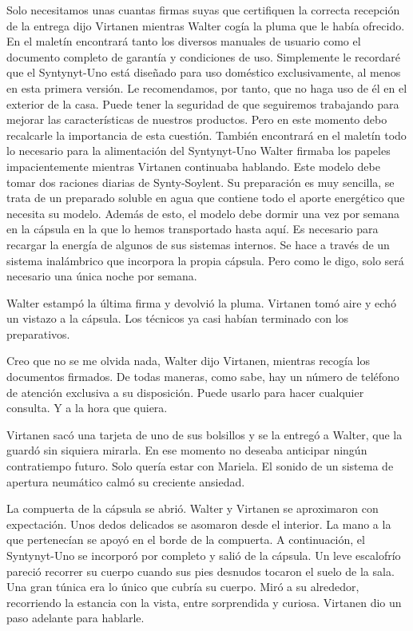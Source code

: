 	\reply Solo necesitamos unas cuantas firmas suyas que certifiquen la correcta recepción de la entrega \pause dijo Virtanen mientras Walter cogía la pluma que le había ofrecido\pauseend. En el maletín encontrará tanto los diversos manuales de usuario como el documento completo de garantía y condiciones de uso. Simplemente le recordaré que el Syntynyt-Uno está diseñado para uso doméstico exclusivamente, al menos en esta primera versión. Le recomendamos, por tanto, que no haga uso de él en el exterior de la casa. Puede tener la seguridad de que seguiremos trabajando para mejorar las características de nuestros productos. Pero en este momento debo recalcarle la importancia de esta cuestión. También encontrará en el maletín todo lo necesario para la alimentación del Syntynyt-Uno \pause Walter firmaba los papeles impacientemente mientras Virtanen continuaba hablando\pauseend. Este modelo debe tomar dos raciones diarias de Synty-Soylent. Su preparación es muy sencilla, se trata de un preparado soluble en agua que contiene todo el aporte energético que necesita su modelo. Además de esto, el modelo debe dormir una vez por semana en la cápsula en la que lo hemos transportado hasta aquí. Es necesario para recargar la energía de algunos de sus sistemas internos. Se hace a través de un sistema inalámbrico que incorpora la propia cápsula. Pero como le digo, solo será necesario una única noche por semana.
	
Walter estampó la última firma y devolvió la pluma. Virtanen tomó aire y echó un vistazo a la cápsula. Los técnicos ya casi habían terminado con los preparativos.
	
	\reply Creo que no se me olvida nada, Walter \pause dijo Virtanen, mientras recogía los documentos firmados\pauseend. De todas maneras, como sabe, hay un número de teléfono de atención exclusiva a su disposición. Puede usarlo para hacer cualquier consulta. Y a la hora que quiera.
	
Virtanen sacó una tarjeta de uno de sus bolsillos y se la entregó a Walter, que la guardó sin siquiera mirarla. En ese momento no deseaba anticipar ningún contratiempo futuro. Solo quería estar con Mariela. El sonido de un sistema de apertura neumático calmó su creciente ansiedad.

La compuerta de la cápsula se abrió. Walter y Virtanen se aproximaron con expectación. Unos dedos delicados se asomaron desde el interior. La mano a la que pertenecían se apoyó en el borde de la compuerta. A continuación, el Syntynyt-Uno se incorporó por completo y salió de la cápsula. Un leve escalofrío pareció recorrer su cuerpo cuando sus pies desnudos tocaron el suelo de la sala. Una gran túnica era lo único que cubría su cuerpo. Miró a su alrededor, recorriendo la estancia con la vista, entre sorprendida y curiosa. Virtanen dio un paso adelante para hablarle.

